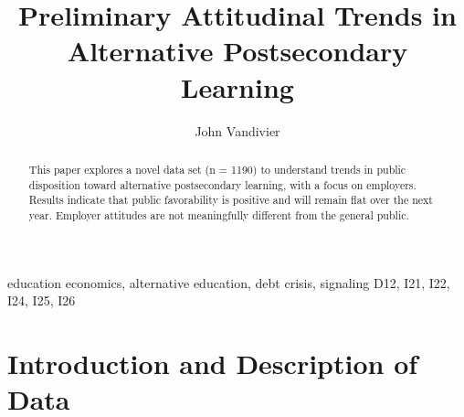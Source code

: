 \documentclass[review]{elsarticle}
\begin{document}
\begin{frontmatter}

\title{
    Preliminary Attitudinal Trends in Alternative Postsecondary Learning
}

\author[mymainaddress]{John Vandivier} %
\address[mymainaddress]{4400 University Dr, Fairfax, VA 22030}




\begin{abstract}
    This paper explores a novel data set (n = 1190) to understand trends in public
    disposition toward alternative postsecondary learning, with a focus on employers.
    Results indicate that public favorability is positive and will remain flat over the next year.
    Employer attitudes are not meaningfully different from the general public.
\end{abstract}

\begin{keyword}
education economics, alternative education, debt crisis, signaling
\MSC[2010] D12, I21, I22, I24, I25, I26
\end{keyword}

\end{frontmatter}

\pagebreak
\linenumbers
        
        \section{Introduction and Description of Data}
\end{document}
